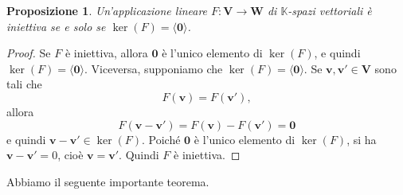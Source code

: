\documentclass{article}
\theoremstyle{plain}
\newtheorem{prop}[thm]{Proposizione}
\theoremstyle{definition}
\theoremstyle{remark}
\begin{document}
\vspace{10pt}

\begin{bxthm}
\begin{prop}
    Un'applicazione lineare \( F\colon \mathbf{V} \to \mathbf{W} \) di \( \mathbb{K} \)-spazi vettoriali è iniettiva se e solo se \( \ker(F) = \langle\mathbf{0}\rangle \).
\end{prop}
\end{bxthm}
\begin{proof}
Se \( F \) è iniettiva, allora \( \mathbf{0} \) è l'unico elemento di \( \ker(F) \), e quindi \( \ker(F) = \langle\mathbf{0}\rangle \). 
Viceversa, supponiamo che \( \ker(F) = \langle\mathbf{0}\rangle \). Se \( \mathbf{v}, \mathbf{v}' \in \mathbf{V} \) sono tali che
\[F(\mathbf{v}) = F(\mathbf{v'}),\]
allora
\[F(\mathbf{v} - \mathbf{v'}) = F(\mathbf{v}) - F(\mathbf{v'}) = \mathbf{0}\]
e quindi \( \mathbf{v} - \mathbf{v'} \in \ker(F) \). Poiché \( \mathbf{0} \) è l'unico elemento di \( \ker(F) \), si ha \( \mathbf{v} - \mathbf{v'} = 0 \), cioè \( \mathbf{v} = \mathbf{v'} \). 
Quindi \( F \) è iniettiva.    
\end{proof}

\vspace{10pt}

Abbiamo il seguente importante teorema.

\vspace{10pt}
\end{document}
